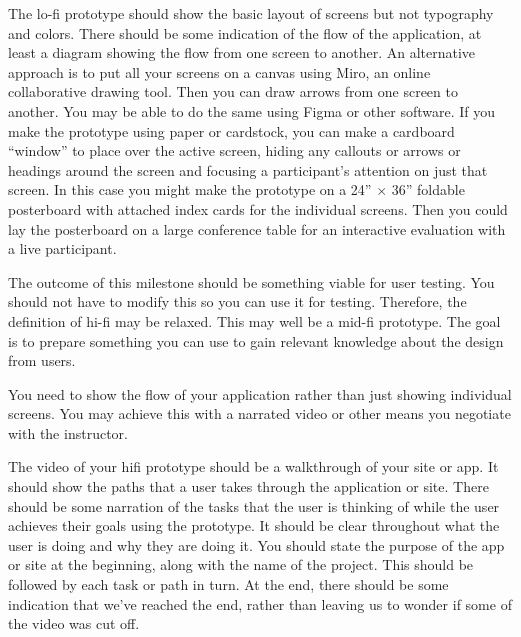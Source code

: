 The lo-fi prototype should show the basic layout of screens but not
typography and colors. There should be some indication of the flow of
the application, at least a diagram showing the flow from one screen to
another. An alternative approach is to put all your screens on a canvas
using Miro, an online collaborative drawing tool. Then you can draw
arrows from one screen to another. You may be able to do the same using
Figma or other software. If you make the prototype using paper or
cardstock, you can make a cardboard ``window'' to place over the active
screen, hiding any callouts or arrows or headings around the screen and
focusing a participant's attention on just that screen. In this case you
might make the prototype on a 24'' \(\times\) 36'' foldable posterboard
with attached index cards for the individual screens. Then you could lay
the posterboard on a large conference table for an interactive
evaluation with a live participant.

\hypertarget{milestone-5.-hi-fi-prototype}{%
\label{milestone-5.-hi-fi-prototype}}

The outcome of this milestone should be something viable for user
testing. You should not have to modify this so you can use it for
testing. Therefore, the definition of hi-fi may be relaxed. This may
well be a mid-fi prototype. The goal is to prepare something you can use
to gain relevant knowledge about the design from users.

You need to show the flow of your application rather than just showing
individual screens. You may achieve this with a narrated video or other
means you negotiate with the instructor.

The video of your hifi prototype should be a walkthrough of your site or
app. It should show the paths that a user takes through the application
or site. There should be some narration of the tasks that the user is
thinking of while the user achieves their goals using the prototype. It
should be clear throughout what the user is doing and why they are doing
it. You should state the purpose of the app or site at the beginning,
along with the name of the project. This should be followed by each task
or path in turn. At the end, there should be some indication that we've
reached the end, rather than leaving us to wonder if some of the video
was cut off.

\hypertarget{final-project-presentation}{%
\label{final-project-presentation}}

